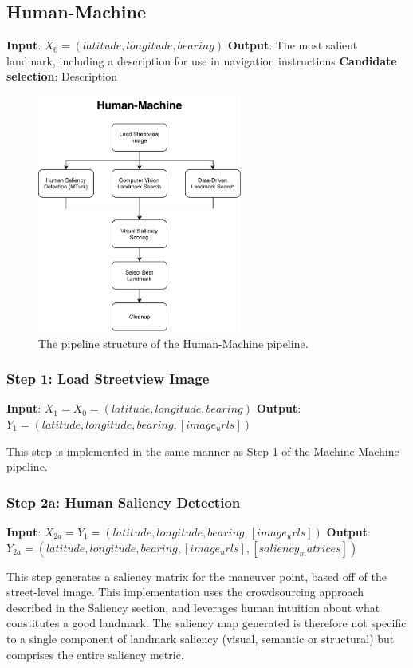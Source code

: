 \subsection{Human-Machine}
\textbf{Input}: $X_0 = (latitude, longitude, bearing)$
\textbf{Output}: The most salient landmark, including a description for use in navigation instructions
\textbf{Candidate selection}: Description

\begin{figure}[htbp]
  \centering
  \includegraphics[width=0.6\textwidth]{pipeline_diagrams/human-machine.pdf}
  \caption{The pipeline structure of the Human-Machine pipeline.}
  \label{fig:pipeline:hm}
\end{figure}

\subsubsection*{Step 1: Load Streetview Image}
\textbf{Input}: $X_1 = X_0 = (latitude, longitude, bearing)$
\textbf{Output}: $Y_1 = (latitude, longitude, bearing, [image_urls])$

This step is implemented in the same manner as Step 1 of the Machine-Machine pipeline.

\subsubsection*{Step 2a: Human Saliency Detection} 
\textbf{Input}: $X_{2a} = Y_1 = (latitude, longitude, bearing, [image_urls])$
\textbf{Output}: $Y_{2a} = (latitude, longitude, bearing, [image_urls], [saliency_matrices])$ 

This step generates a saliency matrix for the maneuver point, based off of the street-level image. This implementation uses the crowdsourcing approach described in the Saliency section, and leverages human intuition about what constitutes a good landmark. The saliency map generated is therefore not specific to a single component of landmark saliency (visual, semantic or structural) but comprises the entire saliency metric. 

